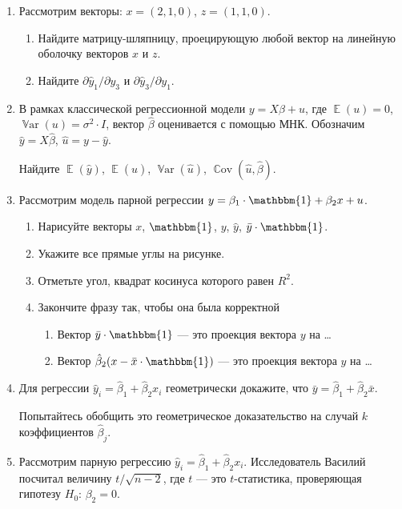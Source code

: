 \documentclass[12pt, a4paper]{article}
\DeclareMathOperator{\E}{\mathbb{E}}
\DeclareMathOperator{\Var}{\mathbb{V}ar}
\DeclareMathOperator{\Cov}{\mathbb{C}ov}
\def \hb{\hat{\beta}}
\def \1{\mathbbm{1}}
\def \hy{\hat{y}}
\begin{document}
\begin{enumerate}

\item Рассмотрим векторы: $x = (2, 1, 0)$, $z = (1, 1, 0)$.
\begin{enumerate}
  \item Найдите матрицу-шляпницу, проецирующую любой вектор на линейную оболочку векторов $x$ и $z$.
  \item Найдите $\partial \hat y_1 / \partial y_3$ и $\partial \hat y_3/ \partial y_1$.
\end{enumerate}



\item В рамках классической регрессионной модели $y=X\beta + u$, где $\E(u)=0$, $\Var(u)=\sigma^2 \cdot I$, вектор $\hb$ оценивается с помощью МНК. Обозначим $\hy=X\hb$, $\hat{u}=y-\hy$.

Найдите $\E(\hy)$, $\E(\hat{u})$, $\Var(\hat u)$, $\Cov(\hat u, \hb)$.

\item Рассмотрим модель парной регрессии $y = \beta_1 \cdot \1 + \beta_2 x + u$.

\begin{enumerate}
  \item Нарисуйте векторы $x$, $\1$, $y$, $\hy$, $\bar y \cdot \1$.
  \item Укажите все прямые углы на рисунке.
  \item Отметьте угол, квадрат косинуса которого равен $R^2$.
  \item Закончите фразу так, чтобы она была корректной
  \begin{enumerate}
    \item Вектор $\bar{y}\cdot \1$ — это проекция вектора $y$ на \ldots
    \item Вектор $\hb_2 (x - \bar x\cdot \1)$ — это проекция вектора $y$ на \ldots
  \end{enumerate}
\end{enumerate}

\item Для регрессии $\hat y_i = \hb_1 + \hb_2 x_i$ геометрически докажите, что $\bar y = \hb_1 + \hb_2 \bar x$.

Попытайтесь обобщить это геометрическое доказательство на случай $k$ коэффициентов $\hb_j$.

\item Рассмотрим парную регрессию $\hat y_i = \hb_1 + \hb_2 x_i$. Исследователь Василий посчитал величину $t/\sqrt{n-2}$, где $t$ — это $t$-статистика, проверяющая гипотезу $H_0$: $\beta_2 = 0$.


\end{enumerate}
\end{document}
